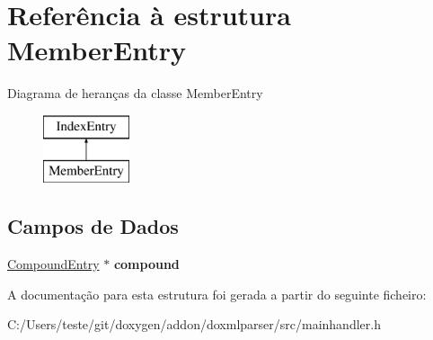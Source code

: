 \hypertarget{struct_member_entry}{\section{Referência à estrutura Member\-Entry}
\label{struct_member_entry}
}
Diagrama de heranças da classe Member\-Entry\begin{figure}[H]
\begin{center}
\leavevmode
\includegraphics[height=2.000000cm]{struct_member_entry}
\end{center}
\end{figure}
\subsection*{Campos de Dados}
\begin{DoxyCompactItemize}
\item 
\hypertarget{struct_member_entry_a65a246137f33f77344ef7ba61c96466a}{\hyperlink{struct_compound_entry}{Compound\-Entry} $\ast$ {\bfseries compound}}\label{struct_member_entry_a65a246137f33f77344ef7ba61c96466a}

\end{DoxyCompactItemize}


A documentação para esta estrutura foi gerada a partir do seguinte ficheiro\-:\begin{DoxyCompactItemize}
\item 
C\-:/\-Users/teste/git/doxygen/addon/doxmlparser/src/mainhandler.\-h\end{DoxyCompactItemize}
